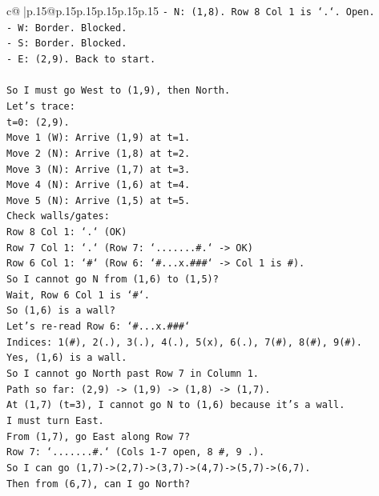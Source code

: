 \documentclass{article}
\begin{document}
{\begin{supertabular}{c@{$\;$}|p{.15\linewidth}@{}p{.15\linewidth}p{.15\linewidth}p{.15\linewidth}p{.15\linewidth}p{.15\linewidth}}
{{{\texttt{{-} N: (1,8). Row 8 Col 1 is `.`. Open.} \\
\texttt{{-} W: Border. Blocked.} \\
\texttt{{-} S: Border. Blocked.} \\
\texttt{{-} E: (2,9). Back to start.} \\
\\ 
\texttt{So I must go West to (1,9), then North.} \\
\texttt{Let's trace:} \\
\texttt{t=0: (2,9).} \\
\texttt{Move 1 (W): Arrive (1,9) at t=1.} \\
\texttt{Move 2 (N): Arrive (1,8) at t=2.} \\
\texttt{Move 3 (N): Arrive (1,7) at t=3.} \\
\texttt{Move 4 (N): Arrive (1,6) at t=4.} \\
\texttt{Move 5 (N): Arrive (1,5) at t=5.} \\
\texttt{Check walls/gates:} \\
\texttt{Row 8 Col 1: `.` (OK)} \\
\texttt{Row 7 Col 1: `.` (Row 7: `.......\#.` {-}> OK)} \\
\texttt{Row 6 Col 1: `\#` (Row 6: `\#...x.\#\#\#` {-}> Col 1 is \#).} \\
\texttt{So I cannot go N from (1,6) to (1,5)?} \\
\texttt{Wait, Row 6 Col 1 is `\#`.} \\
\texttt{So (1,6) is a wall?} \\
\texttt{Let's re{-}read Row 6: `\#...x.\#\#\#`} \\
\texttt{Indices: 1(\#), 2(.), 3(.), 4(.), 5(x), 6(.), 7(\#), 8(\#), 9(\#).} \\
\texttt{Yes, (1,6) is a wall.} \\
\texttt{So I cannot go North past Row 7 in Column 1.} \\
\texttt{Path so far: (2,9) {-}> (1,9) {-}> (1,8) {-}> (1,7).} \\
\texttt{At (1,7) (t=3), I cannot go N to (1,6) because it's a wall.} \\
\texttt{I must turn East.} \\
\texttt{From (1,7), go East along Row 7?} \\
\texttt{Row 7: `.......\#.` (Cols 1{-}7 open, 8 \#, 9 .).} \\
\texttt{So I can go (1,7){-}>(2,7){-}>(3,7){-}>(4,7){-}>(5,7){-}>(6,7).} \\
\texttt{Then from (6,7), can I go North?} \\
}}}
\end{supertabular}}
\end{document}
